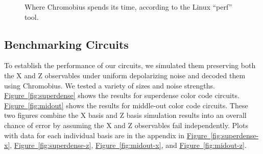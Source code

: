 \documentclass[onecolumn,unpublished,a4paper]{quantumarticle}
\theoremstyle{definition}
\theoremstyle{definition}
\theoremstyle{definition}
\newcommand{\fig}[1]{\hyperref[fig:#1]{Figure~\ref*{fig:#1}}}
\begin{document}
\begin{figure}
    \centering
    \caption{
        Where Chromobius spends its time, according to the Linux ``perf'' tool.
    }
    \label{fig:perf}
\end{figure}


\subsection{Benchmarking Circuits}

To establish the performance of our circuits, we simulated them preserving both the X and Z observables under uniform depolarizing noise and decoded them using Chromobius.
We tested a variety of sizes and noise strengths.
\fig{superdense} shows the results for superdense color code circuits.
\fig{midout} shows the results for middle-out color code circuits.
These two figures combine the X basis and Z basis simulation results into an overall chance of error by assuming the X and Z observables fail independently.
Plots with data for each individual basis are in the appendix in \fig{superdense-x}, \fig{superdense-z}, \fig{midout-x}, and \fig{midout-z}.
\end{document}
